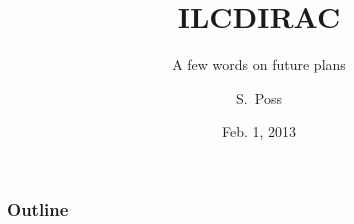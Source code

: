 \documentclass[10pt,table,dvipsnames]{beamer}
\author{S.~Poss}
\title{ILCDIRAC}
\subtitle{A few words on future plans}
\date{Feb. 1, 2013}
\institute{CERN, LAPP}
\begin{document}
\renewcommand{\inserttotalframenumber}{\ref{lastframe}}

\begin{frame}
\titlepage
\end{frame}

\begin{frame}
\frametitle{Outline}
\tableofcontents
\end{frame}

%
\end{document}
